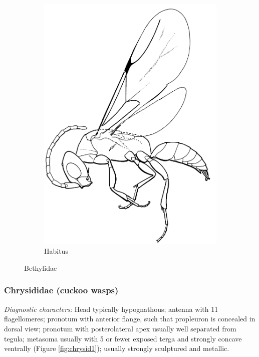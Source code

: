 \documentclass[letterpaper, 11pt]{article}
\begin{document}
\begin{figure}[ht!]
\begin{subfigure}[ht!]{0.35\textwidth}
    \includegraphics[width=\textwidth]{BethylidHabitus}
  \caption{Habitus \citep[][Fig. 37]{goulet1993hymenoptera}}
  \label{fig:bethylid2}
\end{subfigure}
    \caption{Bethylidae}\label{fig:bethylids}
\end{figure}

\subsubsection{Chrysididae (cuckoo wasps)}
\noindent{}\textit{Diagnostic characters:} Head typically hypognathous; antenna with 11 flagellomeres; pronotum with anterior flange, such that propleuron is concealed in dorsal view; pronotum with posterolateral apex usually well separated from tegula; metasoma usually with 5 or fewer exposed terga and strongly concave ventrally (Figure \ref{fig:chrysid1}); usually strongly sculptured and metallic.\\
\end{document}
